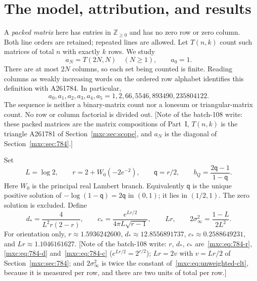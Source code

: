 \documentclass[11pt]{article}
\numberwithin{equation}{section}
\theoremstyle{definition}
\theoremstyle{remark}
\begin{document}
\section{The model, attribution, and results}\label{mxc:pm:sec:model}
A \emph{packed matrix} here has entries in $\mathbb Z_{\ge0}$ and has no
zero row or zero column. Both line orders are retained; repeated lines are
allowed. Let $T(n,k)$ count such matrices of total $n$ with exactly $k$
rows. We study
\[
 a_N=T(2N,N)\quad(N\ge1),\qquad a_0=1.
\]
There are at most $2N$ columns, so each set being counted is finite. Reading
columns as weakly increasing words on the ordered row alphabet identifies
this definition with A261784. In particular,
\[
 a_0,a_1,a_2,a_3,a_4,a_5=1,2,66,5546,893490,235804122.
\]
The sequence is neither a binary-matrix count nor a lonesum or
triangular-matrix count. No row or column factorial is divided out.
[Note of the batch-108 write: these packed matrices are the matrix
compositions of Part~I, $T(n,k)$ is the triangle A261781 of
Section~\ref{mxc:sec:scope}, and $a_N$ is the diagonal of
Section~\ref{mxc:sec:784}.]

Set
\begin{equation}\label{mxc:pm:eq:constants}
 L=\log2,\qquad r=2+W_0(-2e^{-2}),\qquad \mathsf q=r/2,
 \qquad b_Q=\frac{2\mathsf q-1}{1-\mathsf q}.
\end{equation}
Here $W_0$ is the principal real Lambert branch. Equivalently $\mathsf q$ is
the unique positive solution of $-\log(1-\mathsf q)=2\mathsf q$ in $(0,1)$;
it lies in $(1/2,1)$. The zero solution is excluded. Define
\begin{equation}\label{mxc:pm:eq:Cd}
 d_*=\frac{4}{L^2r(2-r)},\qquad
 c_*=\frac{e^{Lr/2}}{4\pi L\sqrt{r-1}},\qquad
 Lr,\qquad 2\sigma_\infty^2=\frac{1-L}{2L^2}.
\end{equation}
For orientation only, $r\approx1.5936242600$, $d_*\approx12.8556891737$,
$c_*\approx0.2588649231$, and $Lr\approx1.1046161627$. [Note of the
batch-108 write: $r$, $d_*$, $c_*$ are~\eqref{mxc:eq:784-r},
\eqref{mxc:eq:784-d} and~\eqref{mxc:eq:784-c} ($e^{Lr/2}=2^{r/2}$);
$Lr=2v$ with $v=Lr/2$ of Section~\ref{mxc:sec:784}; and $2\sigma_\infty^2$ is
twice the constant of~\eqref{mxc:eq:unweighted-clt}, because it is measured
per row, and there are two units of total per row.]
\end{document}
